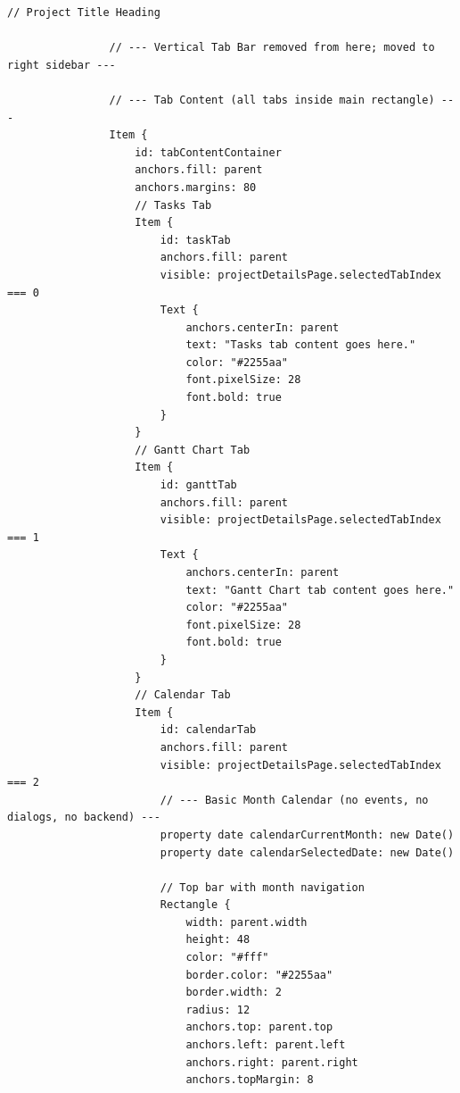 \documentclass{report}
\begin{document}
\begin{lstlisting}[style=qmlstyle]
                // Project Title Heading

                // --- Vertical Tab Bar removed from here; moved to right sidebar ---

                // --- Tab Content (all tabs inside main rectangle) ---
                Item {
                    id: tabContentContainer
                    anchors.fill: parent
                    anchors.margins: 80
                    // Tasks Tab
                    Item {
                        id: taskTab
                        anchors.fill: parent
                        visible: projectDetailsPage.selectedTabIndex === 0
                        Text {
                            anchors.centerIn: parent
                            text: "Tasks tab content goes here."
                            color: "#2255aa"
                            font.pixelSize: 28
                            font.bold: true
                        }
                    }
                    // Gantt Chart Tab
                    Item {
                        id: ganttTab
                        anchors.fill: parent
                        visible: projectDetailsPage.selectedTabIndex === 1
                        Text {
                            anchors.centerIn: parent
                            text: "Gantt Chart tab content goes here."
                            color: "#2255aa"
                            font.pixelSize: 28
                            font.bold: true
                        }
                    }
                    // Calendar Tab
                    Item {
                        id: calendarTab
                        anchors.fill: parent
                        visible: projectDetailsPage.selectedTabIndex === 2
                        // --- Basic Month Calendar (no events, no dialogs, no backend) ---
                        property date calendarCurrentMonth: new Date()
                        property date calendarSelectedDate: new Date()

                        // Top bar with month navigation
                        Rectangle {
                            width: parent.width
                            height: 48
                            color: "#fff"
                            border.color: "#2255aa"
                            border.width: 2
                            radius: 12
                            anchors.top: parent.top
                            anchors.left: parent.left
                            anchors.right: parent.right
                            anchors.topMargin: 8


\end{lstlisting}
\end{document}

